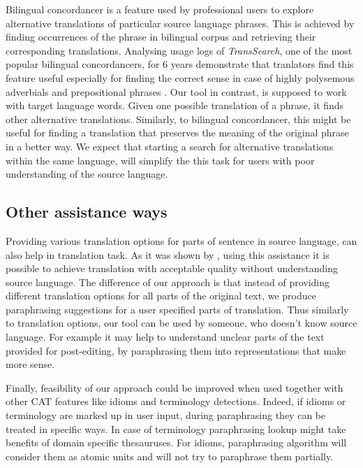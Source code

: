 Bilingual concordancer is a feature used by professional users to explore alternative translations of particular source language phrases. This is achieved by finding occurrences of the phrase in bilingual corpus and retrieving their corresponding translations. Analysing usage logs of \emph{TransSearch}, one of the most popular bilingual concordancers, for 6 years demonstrate that tranlators find this feature useful especially for finding the correct sense in case of highly polysemous adverbials and prepositional phrases \citep{Macklovitch2008}. Our tool in contrast, is supposed to work with target language words. Given one possible translation of a phrase, it finds other alternative translations. Similarly, to bilingual concordancer, this might be useful for finding a translation that preserves the meaning of the original phrase in a better way. We expect that starting a search for alternative translations within the same language, will simplify the this task for users with poor understanding of the source language.

\subsection{Other assistance ways}

Providing various translation options for parts of sentence in source language, can also help in translation task. As it was shown by \cite{Koehn2010}, using this assistance it is possible to achieve translation with acceptable quality without understanding source language. The difference of our approach is that instead of providing different translation options for all parts of the original text, we produce paraphrasing suggestions for a user specified parts of translation. Thus similarly to translation options, our tool can be used by someone, who doesn't know source language. For example it may help to understand unclear parts of the text provided for post-editing, by paraphrasing them into representations that make more sense.

Finally, feasibility of our approach could be improved when used together with other CAT features like idioms and terminology detections. Indeed, if idioms or terminology are marked up in user input, during paraphrasing they can be treated in specific ways. In case of terminology paraphrasing lookup might take benefits of domain specific thesauruses. For idioms, paraphrasing algorithm will consider them as atomic units and will not try to paraphrase them partially. 

